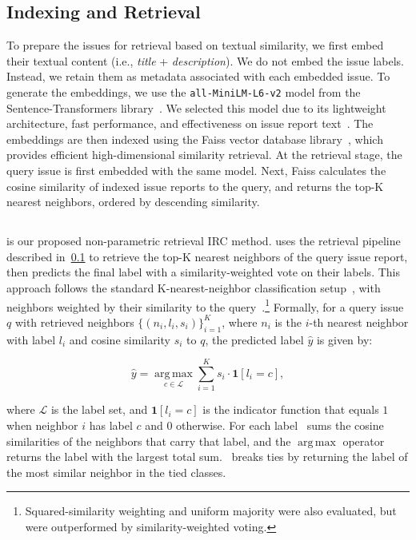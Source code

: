 \subsection{Indexing and Retrieval}
\label{sec:retrieval}
To prepare the issues for retrieval based on textual similarity, we first embed their textual content (i.e., \textit{title} + \textit{description}). We do not embed the issue labels. Instead, we retain them as metadata associated with each embedded issue. To generate the embeddings, we use the \texttt{all-MiniLM-L6-v2} model from the Sentence-Transformers library~\cite{reimers2019sentence}. We selected this model due to its lightweight architecture, fast performance, and effectiveness on issue report text~\cite{huang2025back}. The embeddings are then indexed using the Faiss vector database library~\cite{douze2025faiss}, which provides efficient high-dimensional similarity retrieval. At the retrieval stage, the query issue is first embedded with the same model. Next, Faiss calculates the cosine similarity of indexed issue reports to the query, and returns the top-K nearest neighbors, ordered by descending similarity.

\subsection{\votag}
\label{sec:approach-votag}
\votag is our proposed non-parametric retrieval IRC method. \votag uses the retrieval pipeline described in~\cref{sec:retrieval} to retrieve the top-K nearest neighbors of the query issue report, then predicts the final
label with a similarity-weighted vote on their labels. This approach follows the standard K-nearest-neighbor classification setup~\cite{cover1967nearest}, with neighbors weighted by their similarity to the query~\cite{dudani1976distance}.\footnote{Squared-similarity weighting and uniform majority were also evaluated, but were outperformed by similarity-weighted voting.} Formally, for a
query issue $q$ with retrieved neighbors $\{(n_i, l_i, s_i)\}_{i=1}^{K}$, where
$n_i$ is the $i$-th nearest neighbor with label $l_i$ and cosine similarity $s_i$ to $q$, the predicted label $\hat{y}$ is given by:

\begin{equation}
    \hat{y} = \operatorname*{arg\,max}_{c \in \mathcal{L}}
    \sum_{i=1}^{K} s_i \cdot \mathbf{1}[l_i = c],
    \label{eq:votag}
\end{equation}

where $\mathcal{L}$ is the label set, and $\mathbf{1}[l_i = c]$ is the indicator function that equals $1$ when neighbor $i$ has label $c$ and $0$ otherwise. For each label \votag\ sums the cosine similarities of the neighbors that carry that label, and the $\operatorname*{arg\,max}$ operator returns the label with the largest total sum. \votag\ breaks ties by returning the label of the most similar neighbor in the tied classes.



